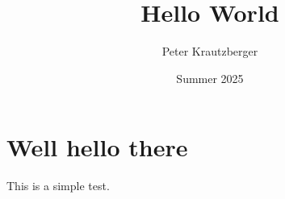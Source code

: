 \documentclass{amsart}
\begin{document}
\title{Hello World}
\author{Peter Krautzberger}
\date{Summer 2025}


\maketitle

\section{Well hello there}

This is a simple test.
\end{document}
